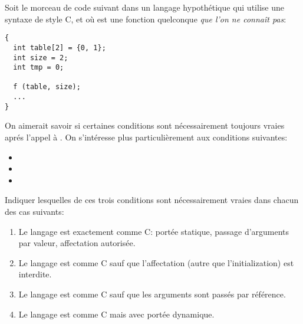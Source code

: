 \begin{Exercise}
\label{ex:raisonner}
  Soit le morceau de code suivant dans un langage hypothétique qui
utilise une syntaxe de style C, et où  est une fonction
quelconque \emph{que l'on ne connaît pas}:
\begin{verbatim}
{
  int table[2] = {0, 1};
  int size = 2;
  int tmp = 0;

  f (table, size);
  ...
}
\end{verbatim}
On aimerait savoir si certaines conditions sont nécessairement
toujours vraies aprés l'appel à .  On s'intéresse plus
particulièrement aux conditions suivantes:
\begin{itemize}
\item {}
\item {}
\item {}
\end{itemize}
Indiquer lesquelles de ces trois conditions sont nécessairement vraies
dans chacun des cas suivants:
\begin{enumerate}
\item Le langage est exactement comme C: portée statique, passage
  d'arguments par valeur, affectation autorisée.
\item Le langage est comme C sauf que l'affectation (autre que
  l'initialization) est interdite.
\item Le langage est comme C sauf que les arguments sont passés par
  référence.
\item Le langage est comme C mais avec portée dynamique.
\end{enumerate}
\end{Exercise}

